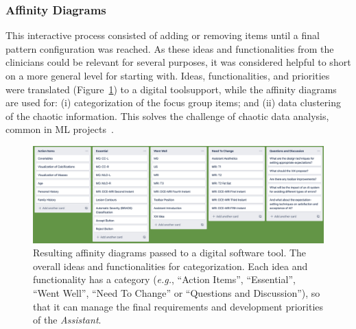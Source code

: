 \subsubsection{Affinity Diagrams}
\label{sec:chap005003003003}

This interactive process consisted of adding or removing items until a final pattern configuration was reached.
As these ideas and functionalities from the clinicians could be relevant for several purposes, it was considered helpful to short on a more general level for starting with.
Ideas, functionalities, and priorities were translated (Figure~\ref{fig:fig039}) to a digital tool\footnotemark[31] support, while the affinity diagrams~\cite{10.1145/3290605.3300628} are used for:
(i) categorization of the focus group items; and
(ii) data clustering of the chaotic information.
This solves the challenge of chaotic data analysis, common in \ac{ML} projects~\cite{10.1145/2858036.2858373, 10.1145/3343413.3377983}.


\begin{figure}[htbp]
\centering
\includegraphics[width=\columnwidth]{images/fig039}
\caption{Resulting affinity diagrams passed to a digital software tool. The overall ideas and functionalities for categorization. Each idea and functionality has a category ({\it e.g.}, ``Action Items'', ``Essential'', ``Went Well'', ``Need To Change'' or ``Questions and Discussion''), so that it can manage the final requirements and development priorities of the {\it Assistant}.}
\label{fig:fig039}
\end{figure}

